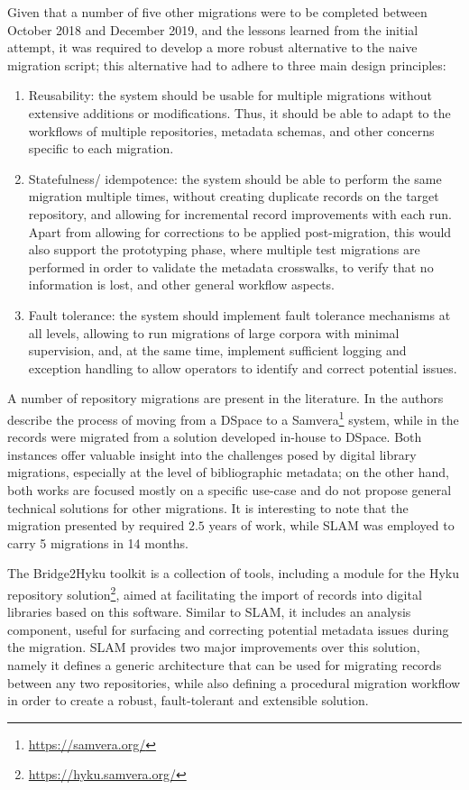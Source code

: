 Given that a number of five other migrations were to be completed between October 2018 and December 2019, and the lessons learned from the initial attempt, it was required to develop a more robust alternative to the naive migration script; this alternative had to adhere to three main design principles:
\begin{enumerate}
    \item Reusability: the system should be usable for multiple migrations without extensive additions or modifications. Thus, it should be able to adapt to the workflows of multiple repositories, metadata schemas, and other concerns specific to each migration.
    \item Statefulness/ idempotence: the system should be able to perform the same migration multiple times, without creating duplicate records on the target repository, and allowing for incremental record improvements with each run. Apart from allowing for corrections to be applied post-migration, this would also support the prototyping phase, where multiple test migrations are performed in order to validate the metadata crosswalks, to verify that no information is lost, and other general workflow aspects.
    \item Fault tolerance: the system should implement fault tolerance mechanisms at all levels, allowing to run migrations of large corpora with minimal supervision, and, at the same time, implement sufficient logging and exception handling to allow operators to identify and correct potential issues.
\end{enumerate}

A number of repository migrations are present in the literature. In \cite{tragedy} the authors describe the process of moving from a DSpace to a Samvera\footnote{\url{https://samvera.org/}} system, while in \cite{challenges} the records were migrated from a solution developed in-house to DSpace. Both instances offer valuable insight into the challenges posed by digital library migrations, especially at the level of bibliographic metadata; on the other hand, both works are focused mostly on a specific use-case and do not propose general technical solutions for other migrations. It is interesting to note that the migration presented by \cite{tragedy} required $2.5$ years of work, while SLAM was employed to carry 5 migrations in 14 months.

The Bridge2Hyku toolkit\cite{bridge} is a collection of tools, including a module for the Hyku repository solution\footnote{\url{https://hyku.samvera.org/}}, aimed at facilitating the import of records into digital libraries based on this software. Similar to SLAM, it includes an analysis component, useful for surfacing and correcting potential metadata issues during the migration. SLAM provides two major improvements over this solution, namely it defines a generic architecture that can be used for migrating records between any two repositories, while also defining a procedural migration workflow in order to create a robust, fault-tolerant and extensible solution.


